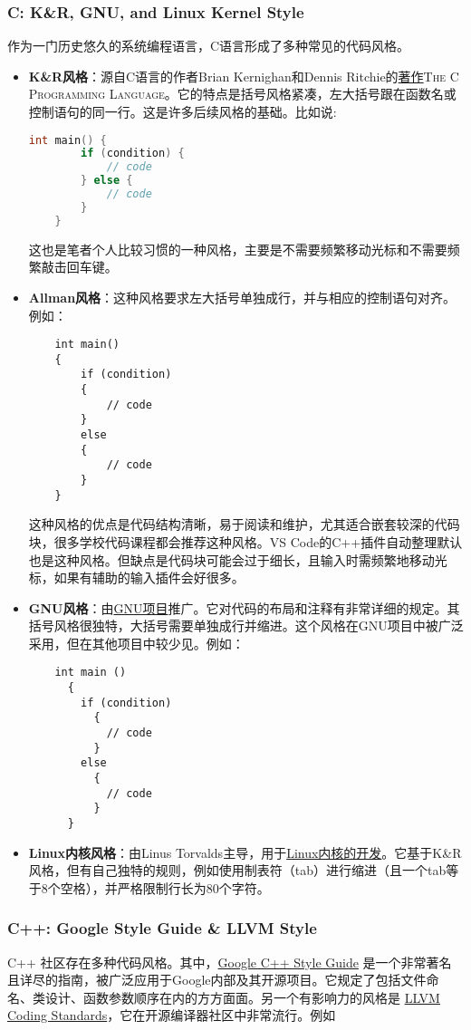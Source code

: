 \subsubsection{C: K\&R, GNU, and Linux Kernel Style}
作为一门历史悠久的系统编程语言，C语言形成了多种常见的代码风格。
\begin{itemize}
  \item \textbf{K\&R风格}：源自C语言的作者Brian Kernighan和Dennis Ritchie的\href{https://en.wikipedia.org/wiki/The_C_Programming_Language}{著作}\textsc{The C Programming Language}。它的特点是括号风格紧凑，左大括号跟在函数名或控制语句的同一行。这是许多后续风格的基础。比如说:
\begin{lstlisting}[language=C]
    int main() {
        if (condition) {
            // code
        } else {
            // code
        }
    }
\end{lstlisting}
  这也是笔者个人比较习惯的一种风格，主要是不需要频繁移动光标和不需要频繁敲击回车键。
  \item \textbf{Allman风格}：这种风格要求左大括号单独成行，并与相应的控制语句对齐。例如：
\begin{lstlisting}
    int main()
    {
        if (condition)
        {
            // code
        }
        else
        {
            // code
        }
    }
\end{lstlisting}
  这种风格的优点是代码结构清晰，易于阅读和维护，尤其适合嵌套较深的代码块，很多学校代码课程都会推荐这种风格。VS Code的C++插件自动整理默认也是这种风格。但缺点是代码块可能会过于细长，且输入时需频繁地移动光标，如果有辅助的输入插件会好很多。
  \item \textbf{GNU风格}：由\href{https://www.gnu.org/prep/standards/standards.html}{GNU项目}推广。它对代码的布局和注释有非常详细的规定。其括号风格很独特，大括号需要单独成行并缩进。这个风格在GNU项目中被广泛采用，但在其他项目中较少见。例如：
\begin{lstlisting}
    int main ()
      {
        if (condition)
          {
            // code
          }
        else
          {
            // code
          }
      }
\end{lstlisting}
  \item \textbf{Linux内核风格}：由Linus Torvalds主导，用于\href{https://www.kernel.org/doc/html/latest/process/coding-style.html}{Linux内核的开发}。它基于K\&R风格，但有自己独特的规则，例如使用制表符（tab）进行缩进（且一个tab等于8个空格），并严格限制行长为80个字符。
\end{itemize}

\subsubsection{C++: Google Style Guide \& LLVM Style}
C++ 社区存在多种代码风格。其中，\href{https://google.github.io/styleguide/cppguide.html}{Google C++ Style Guide} 是一个非常著名且详尽的指南，被广泛应用于Google内部及其开源项目。它规定了包括文件命名、类设计、函数参数顺序在内的方方面面。另一个有影响力的风格是 \href{https://llvm.org/docs/CodingStandards.html}{LLVM Coding Standards}，它在开源编译器社区中非常流行。例如

